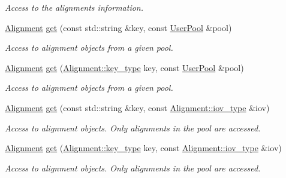 \begin{DoxyCompactItemize}
\begin{DoxyCompactList}\small\item\em Access to the alignments information. \item\end{DoxyCompactList}\item 
\hyperlink{class_d_d4hep_1_1_alignments_1_1_alignment}{Alignment} \hyperlink{class_d_d4hep_1_1_alignments_1_1_det_align_a1487afd0d23a2ce523b29c7e502bf0bd}{get} (const std::string \&key, const \hyperlink{class_d_d4hep_1_1_conditions_1_1_user_pool}{UserPool} \&pool)
\begin{DoxyCompactList}\small\item\em Access to alignment objects from a given pool. \item\end{DoxyCompactList}\item 
\hyperlink{class_d_d4hep_1_1_alignments_1_1_alignment}{Alignment} \hyperlink{class_d_d4hep_1_1_alignments_1_1_det_align_a25f066eaf3999061359f7a46fbd4cfe1}{get} (\hyperlink{class_d_d4hep_1_1_alignments_1_1_alignment_ab824a65f935a0c79b9ea1a7a85014b88}{Alignment::key\_\-type} key, const \hyperlink{class_d_d4hep_1_1_conditions_1_1_user_pool}{UserPool} \&pool)
\begin{DoxyCompactList}\small\item\em Access to alignment objects from a given pool. \item\end{DoxyCompactList}\item 
\hyperlink{class_d_d4hep_1_1_alignments_1_1_alignment}{Alignment} \hyperlink{class_d_d4hep_1_1_alignments_1_1_det_align_aa009f405b4f76dadc3d6e8efae1f338d}{get} (const std::string \&key, const \hyperlink{class_d_d4hep_1_1_i_o_v}{Alignment::iov\_\-type} \&iov)
\begin{DoxyCompactList}\small\item\em Access to alignment objects. Only alignments in the pool are accessed. \item\end{DoxyCompactList}\item 
\hyperlink{class_d_d4hep_1_1_alignments_1_1_alignment}{Alignment} \hyperlink{class_d_d4hep_1_1_alignments_1_1_det_align_af0a58378d82a0076222f0b9b7327f524}{get} (\hyperlink{class_d_d4hep_1_1_alignments_1_1_alignment_ab824a65f935a0c79b9ea1a7a85014b88}{Alignment::key\_\-type} key, const \hyperlink{class_d_d4hep_1_1_i_o_v}{Alignment::iov\_\-type} \&iov)
\begin{DoxyCompactList}\small\item\em Access to alignment objects. Only alignments in the pool are accessed. \item\end{DoxyCompactList}\end{DoxyCompactItemize}


